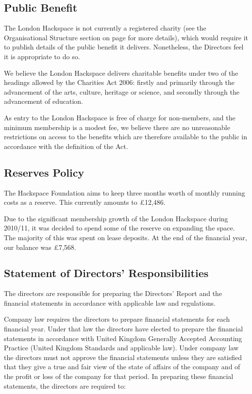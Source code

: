 \subsection{Public Benefit}

The London Hackspace is not currently a registered charity (see the Organisational Structure section on page \pageref{ref_structure} for more details),
which would require it to publish details of the public benefit it delivers. Nonetheless, the Directors feel it is appropriate to do so.

We believe the London Hackspace delivers charitable benefits under two of the headings allowed by the Charities Act 2006:
firstly and primarily through the advancement of the arts, culture, heritage or science, and secondly through the advancement of education.

As entry to the London Hackspace is free of charge for non-members, and the minimum membership is a modest fee, we
believe there are no unreasonable restrictions on access to the benefits which are therefore available to the public in accordance with the
definition of the Act.

\subsection{Reserves Policy}

The Hackspace Foundation aims to keep three months worth of monthly running costs as a reserve. This currently amounts to £12,486.

Due to the significant membership growth of the London Hackspace during 2010/11, it was decided to spend some of the reserve on expanding the space.
The majority of this was spent on lease deposits. At the end of the financial year, our balance was £7,568.

\subsection{Statement of Directors' Responsibilities}
The directors are responsible for preparing the Directors' Report and the financial statements in accordance with applicable law and regulations.

Company law requires the directors to prepare financial statements for each financial year. Under that law the directors have elected to prepare the financial statements in accordance with United Kingdom Generally Accepted Accounting Practice (United Kingdom Standards and applicable law). Under company law the directors must not approve the financial statements unless they are satisfied that they give a true and fair view of the state of affairs of the company and of the profit or loss of the company for that period. In preparing these financial statements, the directors are required to:

